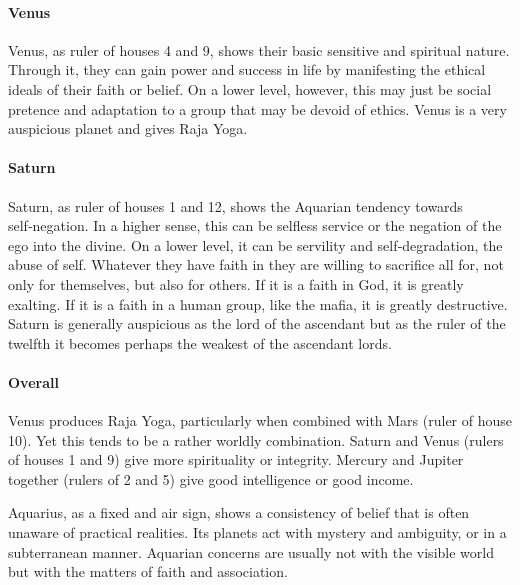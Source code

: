 \paragraph{Venus}

Venus, as ruler of houses 4 and 9, shows their basic sensitive and spiritual nature. Through it, they can gain power and success in life by manifesting the ethical ideals of their faith or belief. On a lower level, however, this may just be social pretence and adaptation to a group that may be devoid of ethics. Venus is a very auspicious planet and gives Raja Yoga.

 

\paragraph{Saturn}

Saturn, as ruler of houses 1 and 12, shows the Aquarian tendency towards self‑negation. In a higher sense, this can be selfless service or the negation of the ego into the divine. On a lower level, it can be servility and self‑degradation, the abuse of self. Whatever they have faith in they are willing to sacrifice all for, not only for themselves, but also for others. If it is a faith in God, it is greatly exalting. If it is a faith in a human group, like the mafia, it is greatly destruc­tive. Saturn is generally auspicious as the lord of the ascendant but as the ruler of the twelfth it becomes perhaps the weakest of the ascendant lords.

 

\paragraph{Overall}

Venus produces Raja Yoga, particularly when combined with Mars (ruler of house 10). Yet this tends to be a rather worldly combination. Saturn and Venus (rulers of houses 1 and 9) give more spirituality or integrity. Mercury and Jupiter together (rulers of 2 and 5) give good intelligence or good income.

 

Aquarius, as a fixed and air sign, shows a consistency of belief that is often unaware of practical realities. Its planets act with mystery and ambiguity, or in a subterranean manner. Aquarian concerns are usually not with the visible world but with the matters of faith and association.

 

